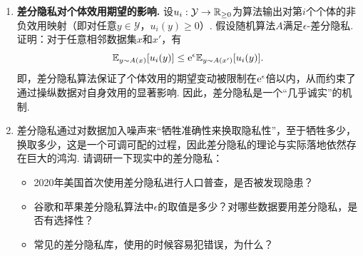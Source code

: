 \begin{enumerate}[wide, labelindent=0pt]
    对于两个$1$-相邻数据集$X$和$X'$，输出$y \in \mathcal Y$和随机算法$A$，我们定义随机算法$A$的\textit{隐私损失}为：
    \[
        c_A(y,  X, X') = \log \frac{\Pr(A( X) = y)}{\Pr(A( X') = y)}.
    \]
    证明：随机算法$A$是$(\epsilon, \delta)$-DP的一个充分条件是其隐私损失满足：
    \[
        \Pr(c_A(y,  X,  X') > \epsilon) \leq \delta.
    \]
    这里的随机性来自随机算法输出$y=A(X)$. 

    \item \textbf{差分隐私对个体效用期望的影响. }设$u_i: \mathcal{Y} \to \mathbb{R}_{\geq 0}$为算法输出对第$i$个个体的非负效用映射（即对任意$y \in \mathcal{Y}$，$u_i(y) \geq 0$）. 假设随机算法$A$满足$\epsilon$-差分隐私. 证明：对于任意相邻数据集$x$和$x'$，有  
    \[
    \mathbb{E}_{y \sim A(x)}[u_i(y)] \leq \mathrm{e}^{\epsilon} \mathbb{E}_{y \sim A(x')}[u_i(y)].
    \]  
    即，差分隐私算法保证了个体效用的期望变动被限制在$\mathrm{e}^{\epsilon}$倍以内，从而约束了通过操纵数据对自身效用的显著影响. 因此，差分隐私是一个“几乎诚实”的机制. 

    \item 差分隐私通过对数据加入噪声来“牺牲准确性来换取隐私性”，至于牺牲多少，换取多少，这是一个可调可配的过程，因此差分隐私的理论与实际落地依然存在巨大的鸿沟. 请调研一下现实中的差分隐私：
    \begin{itemize}
        \item 2020年美国首次使用差分隐私进行人口普查，是否被发现隐患？
        \item 谷歌和苹果差分隐私算法中$\epsilon$的取值是多少？对哪些数据要用差分隐私，是否有选择性？
        \item 常见的差分隐私库，使用的时候容易犯错误，为什么？
    \end{itemize}

\end{enumerate}